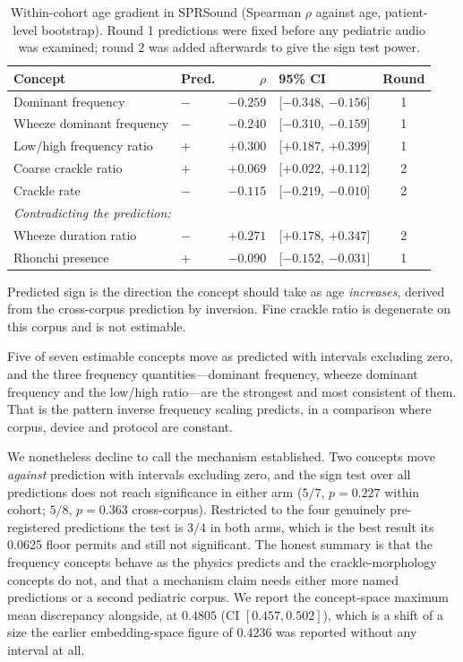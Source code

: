 \documentclass[journal,onecolumn]{IEEEtran}
\begin{document}
\begin{table}[!t]
\centering
\caption{Within-cohort age gradient in SPRSound (Spearman $\rho$ against age,
patient-level bootstrap). Round 1 predictions were fixed before any pediatric audio
was examined; round 2 was added afterwards to give the sign test power.}
\label{tab:pediatric}
\begin{tabular}{llrlc}
\toprule
Concept & Pred. & $\rho$ & 95\% CI & Round \\
\midrule
Dominant frequency        & $-$ & $-0.259$ & [$-0.348$, $-0.156$] & 1 \\
Wheeze dominant frequency & $-$ & $-0.240$ & [$-0.310$, $-0.159$] & 1 \\
Low/high frequency ratio  & $+$ & $+0.300$ & [$+0.187$, $+0.399$] & 1 \\
Coarse crackle ratio      & $+$ & $+0.069$ & [$+0.022$, $+0.112$] & 2 \\
Crackle rate              & $-$ & $-0.115$ & [$-0.219$, $-0.010$] & 2 \\
\midrule
\multicolumn{5}{l}{\emph{Contradicting the prediction:}} \\
Wheeze duration ratio     & $-$ & $+0.271$ & [$+0.178$, $+0.347$] & 2 \\
Rhonchi presence          & $+$ & $-0.090$ & [$-0.152$, $-0.031$] & 1 \\
\bottomrule
\end{tabular}

\vspace{2pt}
\footnotesize Predicted sign is the direction the concept should take as age
\emph{increases}, derived from the cross-corpus prediction by inversion. Fine crackle
ratio is degenerate on this corpus and is not estimable.
\end{table}

Five of seven estimable concepts move as predicted with intervals excluding zero, and
the three frequency quantities---dominant frequency, wheeze dominant frequency and the
low/high ratio---are the strongest and most consistent of them. That is the pattern
inverse frequency scaling predicts, in a comparison where corpus, device and protocol
are constant.

We nonetheless decline to call the mechanism established. Two concepts move
\emph{against} prediction with intervals excluding zero, and the sign test over all
predictions does not reach significance in either arm ($5/7$, $p=0.227$ within cohort;
$5/8$, $p=0.363$ cross-corpus). Restricted to the four genuinely pre-registered
predictions the test is $3/4$ in both arms, which is the best result its 0.0625 floor
permits and still not significant. The honest summary is that the frequency concepts
behave as the physics predicts and the crackle-morphology concepts do not, and that a
mechanism claim needs either more named predictions or a second pediatric corpus. We
report the concept-space maximum mean discrepancy alongside, at $0.4805$ (CI
$[0.457, 0.502]$), which is a shift of a size the earlier embedding-space figure of
0.4236 was reported without any interval at all.
\end{document}
